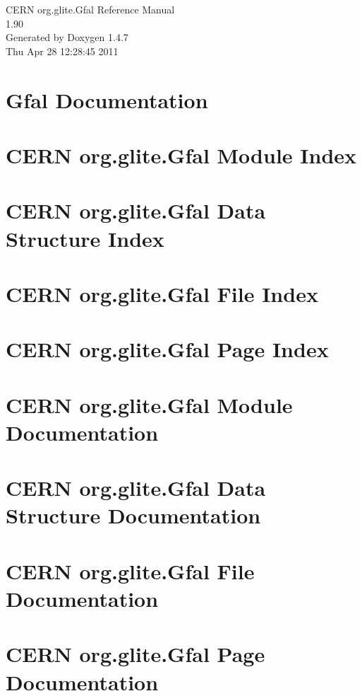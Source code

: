\documentclass[a4paper]{book}
\begin{document}
\begin{titlepage}
\vspace*{7cm}
\begin{center}
{\Large CERN org.glite.Gfal Reference Manual\\[1ex]\large 1.90 }\\
\vspace*{1cm}
{\large Generated by Doxygen 1.4.7}\\
\vspace*{0.5cm}
{\small Thu Apr 28 12:28:45 2011}\\
\end{center}
\end{titlepage}
\clearemptydoublepage
{}
\tableofcontents
\clearemptydoublepage
{}
\chapter{Gfal Documentation }
\label{index}
\chapter{CERN org.glite.Gfal Module Index}

\chapter{CERN org.glite.Gfal Data Structure Index}

\chapter{CERN org.glite.Gfal File Index}

\chapter{CERN org.glite.Gfal Page Index}

\chapter{CERN org.glite.Gfal Module Documentation}





\chapter{CERN org.glite.Gfal Data Structure Documentation}


\chapter{CERN org.glite.Gfal File Documentation}









\chapter{CERN org.glite.Gfal Page Documentation}


\printindex
\end{document}
